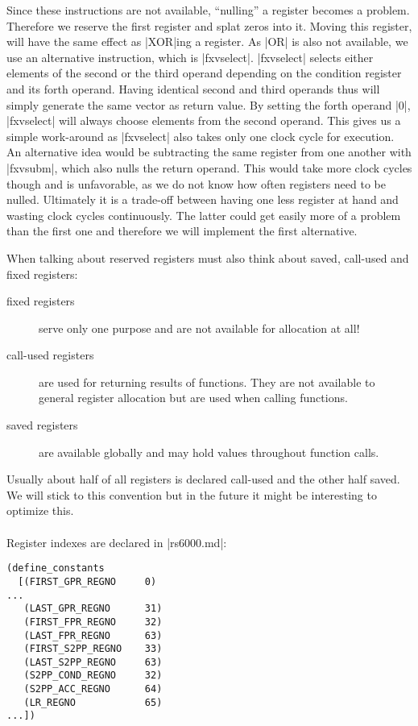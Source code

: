 Since these instructions are not available, ``nulling'' a register becomes a problem.
Therefore we reserve the first register and splat zeros into it.
Moving this register, will have the same effect as |XOR|ing a register.
As |OR| is also not available, we use an alternative instruction, which is |fxvselect|.
|fxvselect| selects either elements of the second or the third operand depending on the condition register and its forth operand.\citep[ch.~5]{nuxmanual}
Having identical second and third operands thus will simply generate the same vector as return value.
By setting the forth operand |0|, |fxvselect| will always choose elements from the second operand.
This gives us a simple work-around as |fxvselect| also takes only one clock cycle for execution.
An alternative idea would be subtracting the same register from one another with |fxvsubm|, which also nulls the return operand.
This would take more clock cycles though and is unfavorable, as we do not know how often registers need to be nulled.
Ultimately it is a trade-off between having one less register at hand and wasting clock cycles continuously.
The latter could get easily more of a problem than the first one and therefore we will implement the first alternative.

When talking about reserved registers must also think about saved, call-used and fixed registers:
\begin{description}
    \item[fixed registers] serve only one purpose and are not available for allocation at all!
    \item[call-used registers] are used for returning results of functions. They are not available to general register allocation but are used when calling functions.
    \item[saved registers] are available globally and may hold values throughout function calls.
\end{description}

Usually about half of all registers is declared call-used and the other half saved.
We will stick to this convention but in the future it might be interesting to optimize this.
\\
\\
Register indexes are declared in |rs6000.md|:
\begin{lstlisting}
(define_constants
  [(FIRST_GPR_REGNO     0)
...
   (LAST_GPR_REGNO      31)
   (FIRST_FPR_REGNO     32)
   (LAST_FPR_REGNO      63)
   (FIRST_S2PP_REGNO    33)
   (LAST_S2PP_REGNO     63)
   (S2PP_COND_REGNO     32)
   (S2PP_ACC_REGNO      64)
   (LR_REGNO            65)
...])
\end{lstlisting}

